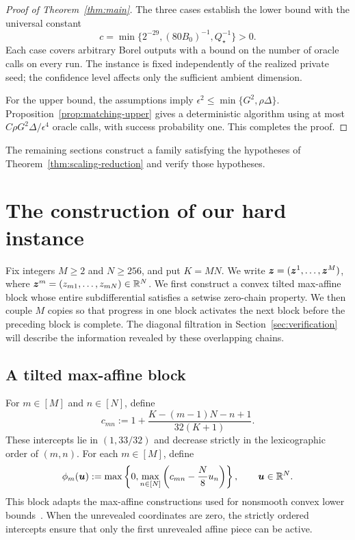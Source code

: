 \begin{proof}[Proof of Theorem~\ref{thm:main}]
The three cases establish the lower bound with the universal constant
\[
 c=\min\{2^{-29},(80B_0)^{-1},Q_\star^{-1}\}>0.
\]
Each case covers arbitrary Borel outputs with a bound on the
number of oracle calls on every run. The instance is fixed
independently of the realized private seed; the confidence level
affects only the sufficient ambient dimension.

For the upper bound, the assumptions imply
$\epsilon^2\le\min\{G^2,\rho\Delta\}$.
Proposition~\ref{prop:matching-upper} gives a deterministic algorithm
using at most $C\rho G^2\Delta/\epsilon^4$ oracle calls, with success
probability one. This completes the proof.
\end{proof}

The remaining sections construct a family satisfying the hypotheses
of Theorem~\ref{thm:scaling-reduction} and verify those hypotheses.


\begingroup
\color{black}
\section{The construction of our hard instance}
\label{sec:construction}
\label{newrand:extension}
Fix integers $M\ge2$ and $N\ge256$, and put $K=MN$.
We write $\bm{z}=(\bm{z}^1,\ldots,\bm{z}^M)$, where
$\bm{z}^m=(z_{m1},\ldots,z_{mN})\in{\mathbb{R}}^N$.
We first construct a convex tilted max-affine block whose entire
subdifferential satisfies a setwise zero-chain property.
We then couple $M$ copies so that progress in one block activates
the next block before the preceding block is complete.
The diagonal filtration in Section~\ref{sec:verification} will
describe the information revealed by these overlapping chains.

\subsection{A tilted max-affine block} 
For $m\in[M]$ and $n\in[N]$, define
\begin{equation}
 c_{mn}:=1+\frac{K-(m-1)N-n+1}{32(K+1)}.
 \label{newrand:fan}
\end{equation}
These intercepts lie in $(1,33/32)$ and decrease strictly in the
lexicographic order of $(m,n)$. For each $m\in[M]$, define
\[
 \phi_m(\bm u)
 :=\max\left\{0,\max_{n\in[N]}
       \left(c_{mn}-\frac N8u_n\right)\right\},
 \qquad \bm u\in{\mathbb{R}}^N.
\]
This block adapts the max-affine constructions used for nonsmooth
convex lower bounds~\citep{WoodworthSrebro2017,DiakonikolasGuzman2020}.
When the unrevealed coordinates are zero, the strictly ordered
intercepts ensure that only the first unrevealed affine piece can
be active.

